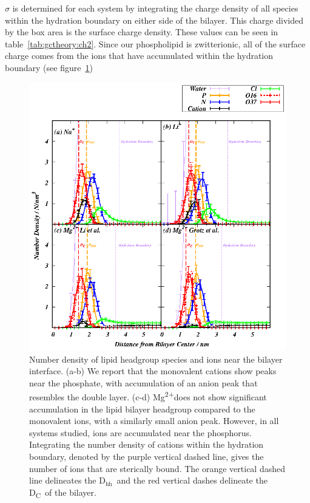 \documentclass[12pt,openany,final]{book}
\newcommand{\dhh}{$\text{D}_\text{hh}$}
\newcommand{\mg}{Mg\textsuperscript{2+}}
\begin{document}
$\sigma$ is determined for
each system by integrating the charge density of all species within the hydration boundary on either side of the bilayer.
This charge divided by the box area is the surface charge density.
These values can be seen in table~\ref{tab:gctheory:ch2}. {Since our
    phospholipid is zwitterionic, all of the surface charge comes from the
ions that have accumulated within 
the hydration boundary (see figure~\ref{fig:dens:ch2})}
\begin{figure}
    \caption[Number densities]{Number density of lipid headgroup species and
    ions near the bilayer interface. (a-b) We report that the 
    monovalent cations show peaks near the phosphate, with
    accumulation of an anion peak that resembles the double layer.
    (c-d) \mg does not show significant accumulation in the 
    lipid bilayer headgroup compared to the monovalent ions,
    with a similarly small anion peak. However, in all systems
    studied, ions are accumulated near the phosphorus.
    Integrating the number density of cations within the hydration boundary,
    denoted by the purple vertical dashed line, gives the number of ions that are
    sterically bound. The orange vertical dashed line delineates the \dhh~and the 
    red vertical dashes
delineate the D\textsubscript{C}~of the bilayer.}
    \label{fig:dens:ch2}
    \includegraphics[width=\textwidth]{Figure_4_ch2.eps}
\end{figure}
\end{document}
